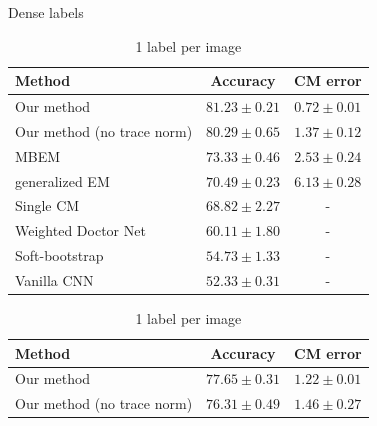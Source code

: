 \begin{table}
    \begin{subtable}[t]{\linewidth}
	    \centering
         \caption{Dense labels}
        \begin{tabular}{lcc}
            \hline
                \toprule
                Method    & Accuracy  & CM error \\
                \midrule
                Our method                                  & $\bm{81.23 \pm 0.21}$ & $\bm{0.72 \pm  0.01}$ \\
                Our method (no trace norm)                  & $80.29 \pm 0.65$ & $1.37 \pm  0.12$ \\
        
                MBEM \cite{khetan2017learning}              & $73.33 \pm 0.46$ & $2.53 \pm 0.24$  \\
                generalized EM \cite{raykar2009supervised}  & $70.49 \pm 0.23$ & $6.13 \pm 0.28$  \\
                \midrule
                Single CM \cite{sukhbaatar2014training}  & $68.82 \pm 2.27$  & -   \\
                Weighted Doctor Net \cite{guan2017said}     & $60.11 \pm 1.80$   &  -  \\
                Soft-bootstrap \cite{reed2014training}      & $54.73 \pm 1.33$ & -    \\
                Vanilla CNN \cite{reed2014training}         & $52.33 \pm 0.31$ & -    \\
        \hline
        \end{tabular}
    \end{subtable}

    \begin{subtable}[t]{\linewidth}
    \centering
    \vspace{5mm}
    \caption{1 label per image}
        \begin{tabular}{lcc}
        \hline
            \toprule
            Method    & Accuracy  & CM error \\
            \midrule
            Our method                                  & $\bm{77.65\pm0.31}$ & $\bm{1.22\pm0.01}$\\
            Our method (no trace norm)                  & $76.31\pm0.49$ & $1.46 \pm 0.27$ \\
    

\end{tabular}
\end{subtable}
\end{table}
